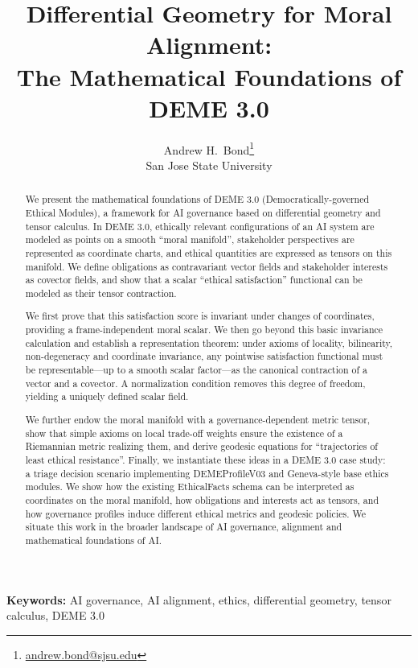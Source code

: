 \documentclass[12pt]{article}
\title{Differential Geometry for Moral Alignment:\\The Mathematical Foundations of DEME 3.0}
\author{Andrew H.\ Bond\thanks{\href{mailto:andrew.bond@sjsu.edu}{andrew.bond@sjsu.edu}}\\
San Jose State University}
\date{}
\theoremstyle{remark}
\begin{document}
\maketitle

\noindent\textbf{Keywords:} AI governance, AI alignment, ethics, differential geometry, tensor calculus, DEME 3.0

\begin{abstract}
We present the mathematical foundations of DEME 3.0 (Democratically-governed Ethical Modules), a framework for AI governance based on differential geometry and tensor calculus. In DEME 3.0, ethically relevant configurations of an AI system are modeled as points on a smooth ``moral manifold'', stakeholder perspectives are represented as coordinate charts, and ethical quantities are expressed as tensors on this manifold. We define obligations as contravariant vector fields and stakeholder interests as covector fields, and show that a scalar ``ethical satisfaction'' functional can be modeled as their tensor contraction.

We first prove that this satisfaction score is invariant under changes of coordinates, providing a frame-independent moral scalar. We then go beyond this basic invariance calculation and establish a representation theorem: under axioms of locality, bilinearity, non-degeneracy and coordinate invariance, any pointwise satisfaction functional must be representable---up to a smooth scalar factor---as the canonical contraction of a vector and a covector. A normalization condition removes this degree of freedom, yielding a uniquely defined scalar field.

We further endow the moral manifold with a governance-dependent metric tensor, show that simple axioms on local trade-off weights ensure the existence of a Riemannian metric realizing them, and derive geodesic equations for ``trajectories of least ethical resistance''. Finally, we instantiate these ideas in a DEME 3.0 case study: a triage decision scenario implementing DEMEProfileV03 and Geneva-style base ethics modules. We show how the existing EthicalFacts schema can be interpreted as coordinates on the moral manifold, how obligations and interests act as tensors, and how governance profiles induce different ethical metrics and geodesic policies. We situate this work in the broader landscape of AI governance, alignment and mathematical foundations of AI.
\end{abstract}

\end{document}
